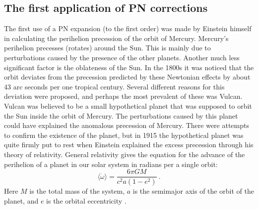 \documentclass[english, oneside]{HYgradu}
\begin{document}
\subsection{The first application of PN corrections}

The first use of a PN expansion (to the first order) was made by Einstein himself in calculating the perihelion precession of the orbit of Mercury.
Mercury's perihelion precesses (rotates) around the Sun. This is mainly due to perturbations caused by the presence of the other planets. Another much less significant factor is the oblateness of the Sun. In the 1800s it was noticed that the orbit deviates from the precession predicted by these Newtonian effects by about 43 arc seconds per one tropical century.
Several different reasons for this deviation were proposed, and perhaps the most prevalent of these was Vulcan. Vulcan was believed to be a small hypothetical planet that was supposed to orbit the Sun inside the orbit of Mercury. The perturbations caused by this planet could have explained the anomalous precession of Mercury. 
There were attempts to confirm the existence of the planet, but in 1915 the hypothetical planet was quite firmly put to rest when Einstein explained the excess precession through his theory of relativity. General relativity gives the equation for the advance of the perihelion of a planet in our solar system in radians per a single orbit:
\begin{equation}
\langle \dot{\omega} \rangle = \frac{6 \pi G M}{c^2 a (1-e^2)} \ . \label{equ:pericenterShift}
\end{equation}
Here $M$ is the total mass of the system, $a$ is the semimajor axis of the orbit of the planet, and $e$ is the orbital eccentricity \citep{will:tegp}.
\end{document}
